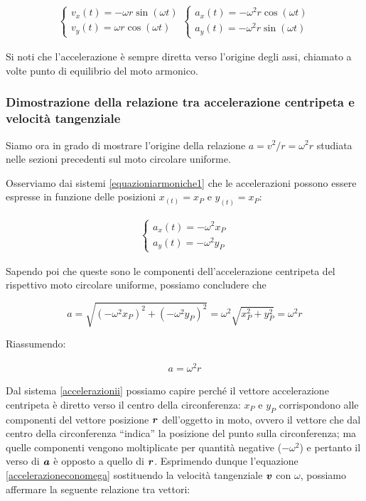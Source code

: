 \begin{align}
    \begin{cases}
        v_x(t) = -\omega r \sin(\omega t)\\
        v_y(t) = \omega r \cos(\omega t)
    \end{cases}
    \begin{cases}
        a_x(t) = -\omega^2 r \cos(\omega t)\\
        a_y(t) = -\omega^2 r \sin(\omega t)
    \end{cases}
    \label{equazioniarmoniche1}
\end{align}

Si noti che l'accelerazione è sempre diretta verso l'origine degli
assi, chiamato a volte punto di equilibrio del moto armonico.

\subsubsection*{Dimostrazione della relazione tra accelerazione centripeta e velocità tangenziale}
Siamo ora in grado di mostrare l'origine della relazione $a = v^2/r = \omega^2 r$
studiata nelle sezioni precedenti sul moto circolare uniforme.

Osserviamo dai sistemi \ref{equazioniarmoniche1} che le accelerazioni
possono essere espresse in funzione delle posizioni $x_(t) = x_P$ e $y_(t) = x_P$:

\begin{align}
    \begin{cases}
        a_x(t) = -\omega^2x_P\\
        a_y(t) = -\omega^2y_P
    \end{cases}
    \label{accelerazionii}
\end{align}

\noindent Sapendo poi che queste sono le componenti dell'accelerazione
centripeta del rispettivo moto circolare uniforme, possiamo concludere
che

\[ a = \sqrt{(-\omega^2 x_P)^2 + (-\omega^2 y_P)^2} = \omega^2 \sqrt{x_P^2 + y_P^2} = \omega^2 r \]

\noindent Riassumendo:

\begin{align}
    a = \omega^2 r\label{accelerazioneconomega}
\end{align}

Dal sistema \ref{accelerazionii} possiamo capire perché il vettore
accelerazione centripeta è diretto verso il centro della circonferenza:
$x_P$ e $y_P$ corrispondono alle componenti del vettore posizione $\textbf{\textit{r}}$
dell'oggetto in moto, ovvero il vettore che dal centro della circonferenza
``indica'' la posizione del punto sulla circonferenza; ma quelle componenti
vengono moltiplicate per quantità negative ($-\omega^2$) e pertanto
il verso di $\textbf{\textit{a}}$ è opposto a quello di $\textbf{\textit{r}}$.
Esprimendo dunque l'equazione \ref{accelerazioneconomega} sostituendo
la velocità tangenziale $\textbf{\textit{v}}$ con $\omega$, possiamo affermare
la seguente relazione tra vettori:

